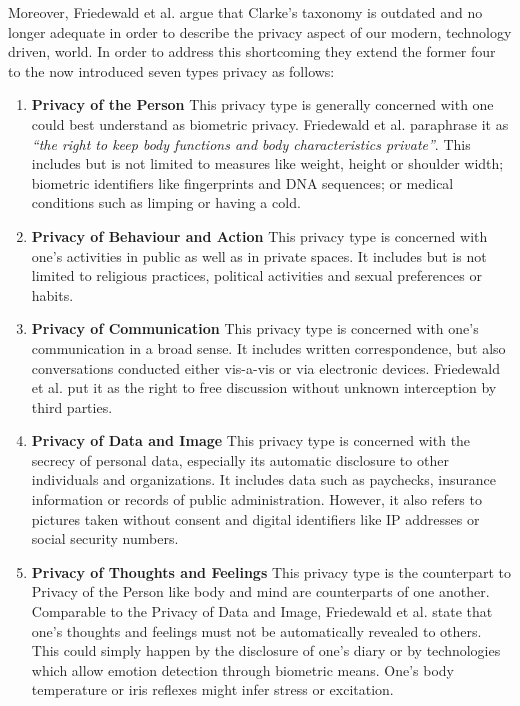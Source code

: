Moreover, Friedewald et al. argue that Clarke's taxonomy is outdated and no longer adequate in order to describe the privacy aspect of our modern, technology driven, world.
In order to address this shortcoming they extend the former four to the now introduced seven types privacy as follows:

\begin{enumerate}

\item \textbf{Privacy of the Person}
This privacy type is generally concerned with one could best understand as biometric privacy.
Friedewald et al. paraphrase it as \emph{``\om the right to keep body functions and body characteristics \om private''}.
This includes but is not limited to measures like weight, height or shoulder width;
biometric identifiers like fingerprints and DNA sequences;
or medical conditions such as limping or having a cold.


\item \textbf{Privacy of Behaviour and Action}
This privacy type is concerned with one's activities in public as well as in private spaces.
It includes but is not limited to religious practices, political activities and sexual preferences or habits.


\item \textbf{Privacy of Communication}
This privacy type is concerned with one's communication in a broad sense.
It includes written correspondence, but also conversations conducted either vis-a-vis or via electronic devices.
Friedewald et al. put it as the right to free discussion without unknown interception by third parties.


\item \textbf{Privacy of Data and Image}
This privacy type is concerned with the secrecy of personal data, especially its automatic disclosure to other individuals and organizations.
It includes data such as paychecks, insurance information or records of public administration.
However, it also refers to pictures taken without consent and digital identifiers like IP addresses or social security numbers.


\item \textbf{Privacy of Thoughts and Feelings}
This privacy type is the counterpart to Privacy of the Person like body and mind are counterparts of one another.
Comparable to the Privacy of Data and Image, Friedewald et al. state that one's thoughts and feelings must not be automatically revealed to others.
This could simply happen by the disclosure of one's diary or by technologies which allow emotion detection through biometric means.
One's body temperature or iris reflexes might infer stress or excitation.



\end{enumerate}

